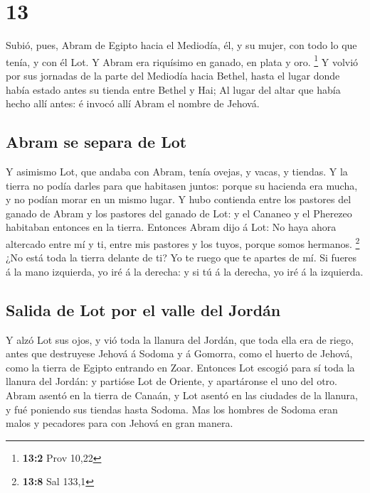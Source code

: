 \hypertarget{section-12}{%
\section{13}\label{section-12}}

 Subió, pues, Abram de Egipto hacia el Mediodía, él, y su
mujer, con todo lo que tenía, y con él Lot.  Y Abram era
riquísimo en ganado, en plata y oro. \footnote{\textbf{13:2} Prov 10,22}
 Y volvió por sus jornadas de la parte del Mediodía hacia
Bethel, hasta el lugar donde había estado antes su tienda entre Bethel y
Hai;  Al lugar del altar que había hecho allí antes: é
invocó allí Abram el nombre de Jehová.

\hypertarget{abram-se-separa-de-lot}{%
\subsection{Abram se separa de Lot}\label{abram-se-separa-de-lot}}

 Y asimismo Lot, que andaba con Abram, tenía ovejas, y
vacas, y tiendas.  Y la tierra no podía darles para que
habitasen juntos: porque su hacienda era mucha, y no podían morar en un
mismo lugar.  Y hubo contienda entre los pastores del ganado
de Abram y los pastores del ganado de Lot: y el Cananeo y el Pherezeo
habitaban entonces en la tierra.  Entonces Abram dijo á Lot:
No haya ahora altercado entre mí y ti, entre mis pastores y los tuyos,
porque somos hermanos. \footnote{\textbf{13:8} Sal 133,1} 
¿No está toda la tierra delante de ti? Yo te ruego que te apartes de mí.
Si fueres á la mano izquierda, yo iré á la derecha: y si tú á la
derecha, yo iré á la izquierda.

\hypertarget{salida-de-lot-por-el-valle-del-jorduxe1n}{%
\subsection{Salida de Lot por el valle del
Jordán}\label{salida-de-lot-por-el-valle-del-jorduxe1n}}

 Y alzó Lot sus ojos, y vió toda la llanura del Jordán, que
toda ella era de riego, antes que destruyese Jehová á Sodoma y á
Gomorra, como el huerto de Jehová, como la tierra de Egipto entrando en
Zoar.  Entonces Lot escogió para sí toda la llanura del
Jordán: y partióse Lot de Oriente, y apartáronse el uno del otro.
 Abram asentó en la tierra de Canaán, y Lot asentó en las
ciudades de la llanura, y fué poniendo sus tiendas hasta Sodoma.
 Mas los hombres de Sodoma eran malos y pecadores para con
Jehová en gran manera.

